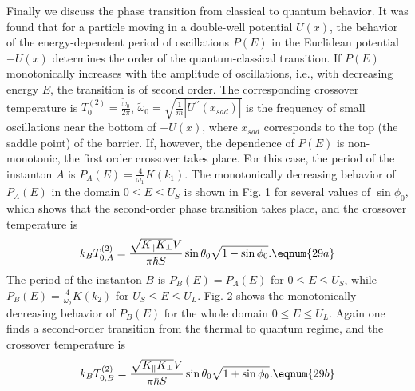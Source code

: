 Finally we discuss the phase transition from classical to quantum behavior.
It was found that for a particle moving in a double-well potential $U\left(
x\right) $, the behavior of the energy-dependent period of oscillations $%
P\left( E\right) $ in the Euclidean potential $-U\left( x\right) $
determines the order of the quantum-classical transition.\cite{28} If $%
P\left( E\right) $ monotonically increases with the amplitude of
oscillations, i.e., with decreasing energy $E$, the transition is of second
order. The corresponding crossover temperature is $T_0^{\left( 2\right) }=%
\frac{\widetilde{\omega }_0}{2\pi }$, $\widetilde{\omega }_0=\sqrt{\frac 1m%
\left| U^{\prime \prime }\left( x_{sad}\right) \right| }$ is the frequency
of small oscillations near the bottom of $-U\left( x\right) $, where $%
x_{sad} $ corresponds to the top (the saddle point) of the barrier. If,
however, the dependence of $P\left( E\right) $ is non-monotonic, the first
order crossover takes place. For this case, the period of the instanton $A$
is $P_A\left( E\right) =\frac 4{\omega _1}K\left( k_1\right) $. The
monotonically decreasing behavior of $P_A\left( E\right) $ in the domain $%
0\leq E\leq U_S$ is shown in Fig. 1 for several values of $\sin \phi _0$,
which shows that the second-order phase transition takes place, and the
crossover temperature is 
\begin{equation}
k_BT_{0,A}^{\left( 2\right) }=\frac{\sqrt{K_{\Vert }K_{\bot }}V}{\pi \hbar S}%
\sin \theta _0\sqrt{1-\sin \phi _0}.  \eqnum{29a}
\end{equation}
The period of the instanton $B$ is $P_B\left( E\right) =P_A\left( E\right) $
for $0\leq E\leq U_S$, while $P_B\left( E\right) =\frac 4{\omega _2}K\left(
k_2\right) $ for $U_S\leq E\leq U_L$. Fig. 2 shows the monotonically
decreasing behavior of $P_B\left( E\right) $ for the whole domain $0\leq
E\leq U_L$. Again one finds a second-order transition from the thermal to
quantum regime, and the crossover temperature is 
\begin{equation}
k_BT_{0,B}^{\left( 2\right) }=\frac{\sqrt{K_{\Vert }K_{\bot }}V}{\pi \hbar S}%
\sin \theta _0\sqrt{1+\sin \phi _0}.  \eqnum{29b}
\end{equation}

